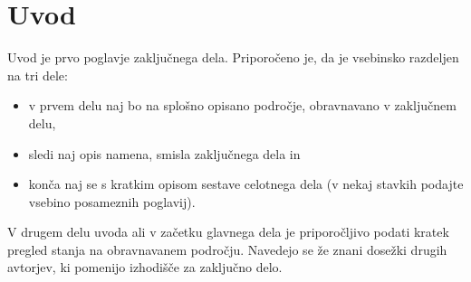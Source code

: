 \chapter{Uvod}
Uvod je prvo poglavje zaključnega dela. Priporočeno je, da je vsebinsko razdeljen na tri dele:
\begin{itemize}
    \item v prvem delu naj bo na splošno opisano področje, obravnavano v zaključnem delu,
    \item sledi naj opis namena, smisla zaključnega dela in
    \item konča naj se s kratkim opisom sestave celotnega dela (v nekaj stavkih podajte vsebino posameznih poglavij).
\end{itemize}
V drugem delu uvoda ali v začetku glavnega dela je priporočljivo podati kratek pregled stanja na obravnavanem področju. Navedejo se že znani dosežki drugih avtorjev, ki pomenijo izhodišče za zaključno delo.